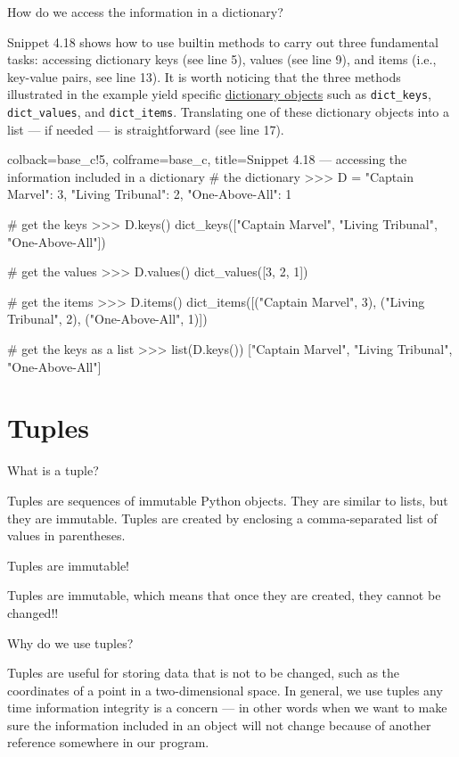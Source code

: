 \documentclass[a4paper,11pt]{book}
\numberwithin{figure}{chapter}
\numberwithin{table}{chapter}
\newcommand{\question}[1]{%
    \begin{tcolorbox}[colback=comp_c!10,colframe=comp_c,sidebyside align=top,width=\linewidth,before skip=1ex]
        #1
    \end{tcolorbox}
    \switchcolumn%
}
\newcommand{\note}[1]{%
    \begin{tcolorbox}[colback=white!0,colframe=white!10,width=\linewidth,before skip=1ex]
        #1
    \end{tcolorbox}
}
\begin{document}
\begin{paracol}{2}
\question{\raggedright How do we access the information in a dictionary?}
\note{Snippet 4.18 shows how to use builtin methods to carry out three fundamental tasks: accessing dictionary keys (see line 5), values (see line 9), and items (i.e., key-value pairs, see line 13). It is worth noticing that the three methods illustrated in the example yield specific \href{https://docs.python.org/3/c-api/dict.html}{dictionary objects} such as \texttt{dict\_keys}, \texttt{dict\_values}, and \texttt{dict\_items}. Translating one of these dictionary objects into a list --- if needed --- is straightforward (see line 17).}
\end{paracol}

\begin{pythoncode}[linenos=true,]{colback=base_c!5, colframe=base_c, title=\sffamily Snippet 4.18 --- accessing the information included in a dictionary}
# the dictionary 
>>> D = {"Captain Marvel": 3, "Living Tribunal": 2, "One-Above-All": 1}

# get the keys
>>> D.keys()
dict_keys(["Captain Marvel", "Living Tribunal", "One-Above-All"])

# get the values 
>>> D.values()
dict_values([3, 2, 1])

# get the items
>>> D.items()
dict_items([("Captain Marvel", 3), ("Living Tribunal", 2), ("One-Above-All", 1)])

# get the keys as a list 
>>> list(D.keys())
["Captain Marvel", "Living Tribunal", "One-Above-All"]
\end{pythoncode}

\section{Tuples}

\begin{paracol}{2}
	\question{\raggedright What is a tuple?}
	\note{Tuples are sequences of immutable Python objects. They are similar to lists, but they are immutable. Tuples are created by enclosing a comma-separated list of values in parentheses.}
\end{paracol}

\begin{paracol}{2}
	\question{\raggedright Tuples are immutable!}
	\note{Tuples are immutable, which means that once they are created, they cannot be changed!! }
\end{paracol}

\begin{paracol}{2}
\question{\raggedright Why do we use tuples?}
\note{Tuples are useful for storing data that is not to be changed, such as the coordinates of a point in a two-dimensional space. In general, we use tuples any time information integrity is a concern --- in other words when we want to make sure the information included in an object will not change because of another reference somewhere in our program.}
\end{paracol}
\end{document}
